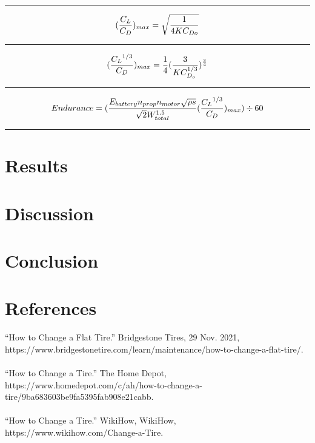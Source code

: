 \documentclass[12pt,A4paper]{article}
\begin{document}
	\hrule
	\vspace{0.1 in}
	\begin{equation}
		(\frac{C_L}{C_D})_{max} = \sqrt{\frac{1}{4 K C_{D o}}} \\
	\end{equation}
	\hrule
	\vspace{0.1 in}
	\begin{equation}
		(\frac{{C_L}^{1/3}}{C_D})_{max} = \frac{1}{4} (\frac{3}{K C_{D_o}^{1/3}})^{\frac{3}{4}} \\
	\end{equation}
	\hrule
	\vspace{0.1 in}
	\begin{equation}
		Endurance = (\frac{E_{battery} n_{prop} n_{motor} \sqrt{\rho s}}{\sqrt{2} W_{total}^{1.5}} (\frac{{C_L}^{1/3}}{C_D})_{max}) \div 60 \\
	\end{equation}
	\hrule
	\vspace{0.1 in}
	\section{Results}
	\section{Discussion}
	\section{Conclusion}

	\section{References}
	“How to Change a Flat Tire.” Bridgestone Tires, 29 Nov. 2021, https://www.bridgestonetire.com/learn/maintenance/how-to-change-a-flat-tire/.\\ \\
	“How to Change a Tire.” The Home Depot, https://www.homedepot.com/c/ah/how-to-change-a-tire/9ba683603be9fa5395fab908e21cabb.\\ \\
	“How to Change a Tire.” WikiHow, WikiHow, https://www.wikihow.com/Change-a-Tire.\\
	
	
\end{document}
